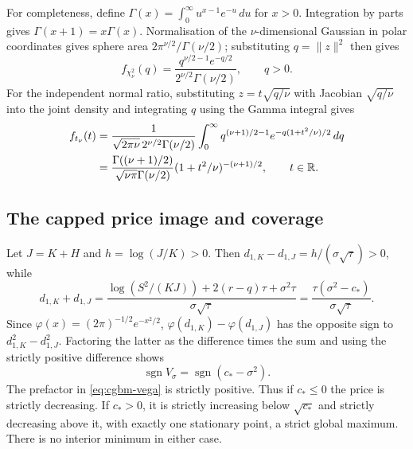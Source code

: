 \documentclass[11pt]{article}
\begin{document}
For completeness, define $\Gamma(x)=\int_0^\infty u^{x-1}e^{-u}\,du$
for $x>0$. Integration by parts gives $\Gamma(x+1)=x\Gamma(x)$.
Normalisation of the $\nu$-dimensional Gaussian in polar coordinates
gives sphere area $2\pi^{\nu/2}/\Gamma(\nu/2)$; substituting
$q=\|z\|^2$ then gives
\begin{equation}
 f_{\chi^2_\nu}(q)=\frac{q^{\nu/2-1}e^{-q/2}}
 {2^{\nu/2}\Gamma(\nu/2)},\qquad q>0.
 \label{eq:cgbm-chi-square-density}
\end{equation}
For the independent normal ratio, substituting $z=t\sqrt{q/\nu}$
with Jacobian $\sqrt{q/\nu}$ into the joint density and integrating
$q$ using the Gamma integral gives
\begin{align}
 f_{t_\nu}(t)&=\frac{1}{\sqrt{2\pi\nu}\,2^{\nu/2}\Gamma(\nu/2)}
 \int_0^\infty q^{(\nu+1)/2-1}
 e^{-q(1+t^2/\nu)/2}\,dq\notag\\
 &=\frac{\Gamma((\nu+1)/2)}{\sqrt{\nu\pi}\Gamma(\nu/2)}
 (1+t^2/\nu)^{-(\nu+1)/2},\qquad t\in\mathbb R.
 \label{eq:cgbm-student-density}
\end{align}

\subsection{The capped price image and coverage}

Let $J=K+H$ and $h=\log(J/K)>0$. Then
$d_{1,K}-d_{1,J}=h/(\sigma\sqrt\tau)>0$, while
\begin{equation}
 d_{1,K}+d_{1,J}
 =\frac{\log(S^2/(KJ))+2(r-q)\tau+\sigma^2\tau}
 {\sigma\sqrt\tau}
 =\frac{\tau(\sigma^2-c_*)}{\sigma\sqrt\tau}.
 \label{eq:cgbm-vega-sign-factorisation}
\end{equation}
Since $\varphi(x)=(2\pi)^{-1/2}e^{-x^2/2}$,
$\varphi(d_{1,K})-\varphi(d_{1,J})$ has the opposite sign to
$d_{1,K}^2-d_{1,J}^2$. Factoring the latter as the difference
times the sum and using the strictly positive difference shows
\begin{equation}
 \operatorname{sgn} V_\sigma=\operatorname{sgn}(c_*-\sigma^2).
 \label{eq:cgbm-vega-sign}
\end{equation}
The prefactor in \eqref{eq:cgbm-vega} is strictly positive.
Thus if $c_*\leq0$ the price is strictly decreasing. If $c_*>0$,
it is strictly increasing below $\sqrt{c_*}$ and strictly decreasing
above it, with exactly one stationary point, a strict global maximum.
There is no interior minimum in either case.
\end{document}

